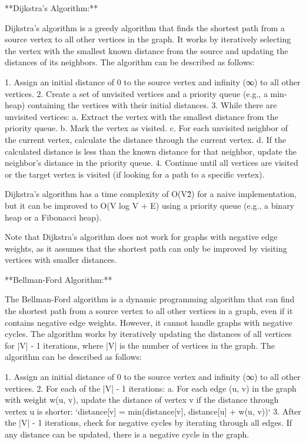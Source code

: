 \documentclass{article}
\begin{document}
**Dijkstra's Algorithm:**

Dijkstra's algorithm is a greedy algorithm that finds the shortest path from a source vertex to all other vertices in the graph. It works by iteratively selecting the vertex with the smallest known distance from the source and updating the distances of its neighbors. The algorithm can be described as follows:

1. Assign an initial distance of 0 to the source vertex and infinity (∞) to all other vertices.
2. Create a set of unvisited vertices and a priority queue (e.g., a min-heap) containing the vertices with their initial distances.
3. While there are unvisited vertices:
   a. Extract the vertex with the smallest distance from the priority queue.
   b. Mark the vertex as visited.
   c. For each unvisited neighbor of the current vertex, calculate the distance through the current vertex.
   d. If the calculated distance is less than the known distance for that neighbor, update the neighbor's distance in the priority queue.
4. Continue until all vertices are visited or the target vertex is visited (if looking for a path to a specific vertex).

Dijkstra's algorithm has a time complexity of O(V\^2) for a naive implementation, but it can be improved to O(V log V + E) using a priority queue (e.g., a binary heap or a Fibonacci heap).

Note that Dijkstra's algorithm does not work for graphs with negative edge weights, as it assumes that the shortest path can only be improved by visiting vertices with smaller distances.

**Bellman-Ford Algorithm:**

The Bellman-Ford algorithm is a dynamic programming algorithm that can find the shortest path from a source vertex to all other vertices in a graph, even if it contains negative edge weights. However, it cannot handle graphs with negative cycles. The algorithm works by iteratively updating the distances of all vertices for |V| - 1 iterations, where |V| is the number of vertices in the graph. The algorithm can be described as follows:

1. Assign an initial distance of 0 to the source vertex and infinity (∞) to all other vertices.
2. For each of the |V| - 1 iterations:
   a. For each edge (u, v) in the graph with weight w(u, v), update the distance of vertex v if the distance through vertex u is shorter: `distance[v] = min(distance[v], distance[u] + w(u, v))`
3. After the |V| - 1 iterations, check for negative cycles by iterating through all edges. If any distance can be updated, there is a negative cycle in the graph.
\end{document}
